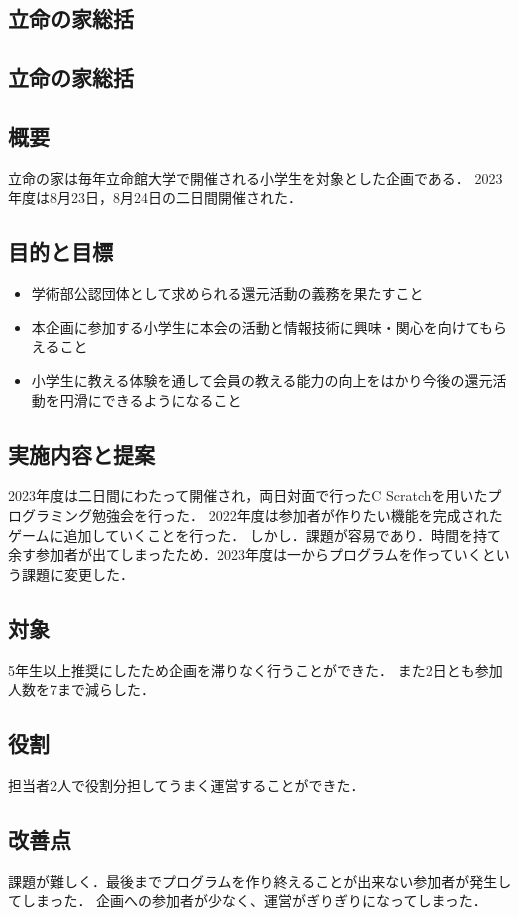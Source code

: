 \subsection*{立命の家総括}
\subsection*{立命の家総括}


\subsection*{概要}
立命の家は毎年立命館大学で開催される小学生を対象とした企画である．
2023年度は8月23日，8月24日の二日間開催された．

\subsection*{目的と目標}
\begin{itemize}
    \item 学術部公認団体として求められる還元活動の義務を果たすこと
    \item 本企画に参加する小学生に本会の活動と情報技術に興味・関心を向けてもらえること
    \item 小学生に教える体験を通して会員の教える能力の向上をはかり今後の還元活動を円滑にできるようになること
\end{itemize}
\subsection*{実施内容と提案}
2023年度は二日間にわたって開催され，両日対面で行ったC
Scratchを用いたプログラミング勉強会を行った．
2022年度は参加者が作りたい機能を完成されたゲームに追加していくことを行った．
しかし．課題が容易であり．時間を持て余す参加者が出てしまったため．2023年度は一からプログラムを作っていくという課題に変更した．

\subsection*{対象}
5年生以上推奨にしたため企画を滞りなく行うことができた．
また2日とも参加人数を7まで減らした．

\subsection*{役割}
担当者2人で役割分担してうまく運営することができた．

\subsection*{改善点}
課題が難しく．最後までプログラムを作り終えることが出来ない参加者が発生してしまった．
企画への参加者が少なく、運営がぎりぎりになってしまった．
